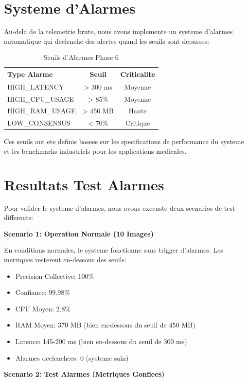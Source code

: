 \documentclass[12pt,a4paper]{report}
\begin{document}
\section{Systeme d'Alarmes}

Au-dela de la telemetrie brute, nous avons implemente un systeme d'alarmes automatique qui declenche des alertes quand les seuils sont depasses:

\begin{table}[H]
\centering
\begin{tabular}{|l|c|c|}
\hline
\textbf{Type Alarme} & \textbf{Seuil} & \textbf{Criticalite} \\
\hline
HIGH\_LATENCY & > 300 ms & Moyenne \\
HIGH\_CPU\_USAGE & > 85\% & Moyenne \\
HIGH\_RAM\_USAGE & > 450 MB & Haute \\
LOW\_CONSENSUS & < 70\% & Critique \\
\hline
\end{tabular}
\caption{Seuils d'Alarmes Phase 6}
\end{table}

Ces seuils ont ete definis basees sur les specifications de performance du systeme et les benchmarks industriels pour les applications medicales.

\section{Resultats Test Alarmes}

Pour valider le systeme d'alarmes, nous avons execuste deux scenarios de test differents:

\textbf{Scenario 1: Operation Normale (10 Images)}

En conditions normales, le systeme fonctionne sans trigger d'alarmes. Les metriques resterent en-dessous des seuils:
\begin{itemize}
    \item Precision Collective: 100\%
    \item Confiance: 99.98\%
    \item CPU Moyen: 2.8\%
    \item RAM Moyen: 370 MB (bien en-dessous du seuil de 450 MB)
    \item Latence: 145-200 ms (bien en-dessous du seuil de 300 ms)
    \item Alarmes declenchees: 0 (systeme sain)
\end{itemize}

\textbf{Scenario 2: Test Alarmes (Metriques Gonflees)}
\end{document}
